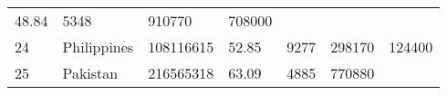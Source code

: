 \documentclass[
]{article}
\begin{document}
\begin{longtable}[]{@{}lllllll@{}}
\begin{minipage}[t]{0.13\columnwidth}
48.84\strut
\end{minipage} & \begin{minipage}[t]{0.09\columnwidth}\raggedright
5348\strut
\end{minipage} & \begin{minipage}[t]{0.12\columnwidth}\raggedright
910770\strut
\end{minipage} & \begin{minipage}[t]{0.12\columnwidth}\raggedright
708000\strut
\end{minipage}\tabularnewline
\begin{minipage}[t]{0.06\columnwidth}\raggedright
24\strut
\end{minipage} & \begin{minipage}[t]{0.15\columnwidth}\raggedright
Philippines\strut
\end{minipage} & \begin{minipage}[t]{0.13\columnwidth}\raggedright
108116615\strut
\end{minipage} & \begin{minipage}[t]{0.13\columnwidth}\raggedright
52.85\strut
\end{minipage} & \begin{minipage}[t]{0.09\columnwidth}\raggedright
9277\strut
\end{minipage} & \begin{minipage}[t]{0.12\columnwidth}\raggedright
298170\strut
\end{minipage} & \begin{minipage}[t]{0.12\columnwidth}\raggedright
124400\strut
\end{minipage}\tabularnewline
\begin{minipage}[t]{0.06\columnwidth}\raggedright
25\strut
\end{minipage} & \begin{minipage}[t]{0.15\columnwidth}\raggedright
Pakistan\strut
\end{minipage} & \begin{minipage}[t]{0.13\columnwidth}\raggedright
216565318\strut
\end{minipage} & \begin{minipage}[t]{0.13\columnwidth}\raggedright
63.09\strut
\end{minipage} & \begin{minipage}[t]{0.09\columnwidth}\raggedright
4885\strut
\end{minipage} & \begin{minipage}[t]{0.12\columnwidth}\raggedright
770880\strut
\end{minipage} & \begin{minipage}[t]{0.12\columnwidth}\raggedright

\end{minipage}
\end{longtable}
\end{document}
